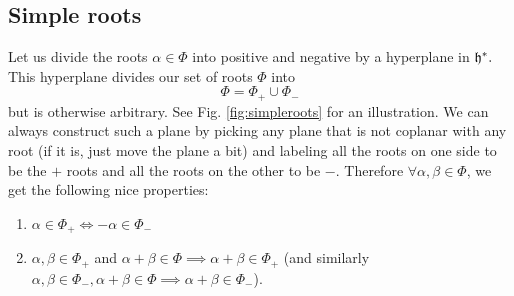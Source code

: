 \subsection*{Simple roots} Let us divide the roots $\alpha\in \Phi$ into positive and negative by a hyperplane in $\mathfrak{h}^*.$ This hyperplane divides our set of roots $\Phi$ into
$$\Phi=\Phi_+ \cup \Phi_-$$
but is otherwise arbitrary. See Fig. \ref{fig:simpleroots} for an illustration. We can always construct such a plane by picking any plane that is not coplanar with any root (if it is, just move the plane a bit) and labeling all the roots on one side to be the $+$ roots and all the roots on the other to be $-$. Therefore
$\forall \alpha,\beta \in \Phi$, we get the following nice properties:
\begin{enumerate}
    \item $\alpha\in \Phi_+\iff -\alpha \in \Phi_-$
    \item $\alpha,\beta \in \Phi_+$ and $\alpha + \beta \in \Phi \implies \alpha+\beta \in \Phi_+$ (and similarly $\alpha,\beta\in \Phi_-, \alpha+\beta\in \Phi \implies \alpha+\beta \in \Phi_-$).
\end{enumerate}

